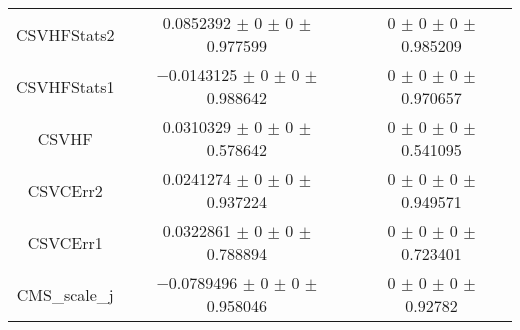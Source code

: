 \begin{table}
\begin{tabular}{ccc}
CSVHFStats2 	& \num{0.0852392} $\pm$ \num{0} $\pm$ \num{0} $\pm$ \num{0.977599} 	& \num{0} $\pm$ \num{0} $\pm$ \num{0} $\pm$ \num{0.985209}\\
CSVHFStats1 	& \num{-0.0143125} $\pm$ \num{0} $\pm$ \num{0} $\pm$ \num{0.988642} 	& \num{0} $\pm$ \num{0} $\pm$ \num{0} $\pm$ \num{0.970657}\\
CSVHF 	& \num{0.0310329} $\pm$ \num{0} $\pm$ \num{0} $\pm$ \num{0.578642} 	& \num{0} $\pm$ \num{0} $\pm$ \num{0} $\pm$ \num{0.541095}\\
CSVCErr2 	& \num{0.0241274} $\pm$ \num{0} $\pm$ \num{0} $\pm$ \num{0.937224} 	& \num{0} $\pm$ \num{0} $\pm$ \num{0} $\pm$ \num{0.949571}\\
CSVCErr1 	& \num{0.0322861} $\pm$ \num{0} $\pm$ \num{0} $\pm$ \num{0.788894} 	& \num{0} $\pm$ \num{0} $\pm$ \num{0} $\pm$ \num{0.723401}\\
CMS\_scale\_j 	& \num{-0.0789496} $\pm$ \num{0} $\pm$ \num{0} $\pm$ \num{0.958046} 	& \num{0} $\pm$ \num{0} $\pm$ \num{0} $\pm$ \num{0.92782}\\
\bottomrule
\end{tabular}
\end{table}